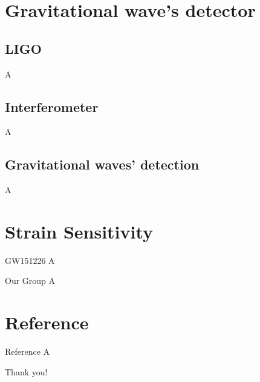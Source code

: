 \documentclass[pdf]{beamer}
\begin{document}
\section{Gravitational wave's detector}
\subsection{LIGO}
\begin{frame}
A
\end{frame}

\subsection{Interferometer}
\begin{frame}
A
\end{frame}

\subsection{Gravitational waves' detection}
\begin{frame}
A
\end{frame}


\section{Strain Sensitivity}
\begin{frame}{GW151226}
A
\end{frame}


\begin{frame}{Our Group}
A
\end{frame}

\section*{Reference}
\begin{frame}{Reference}
A
\end{frame}

\begin{frame}
\begin{center}
\Huge Thank you!
\end{center}
\end{frame}
\end{document}
